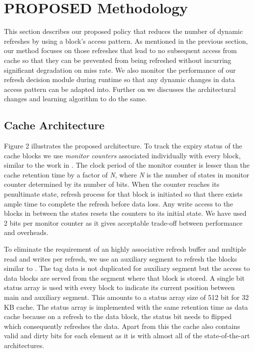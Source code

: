 \documentclass[sigconf]{acmart}
\begin{document}
\section{PROPOSED Methodology}
This section describes our proposed policy that reduces the number of dynamic refreshes by using a block's access pattern. As mentioned in the previous section, our method focuses on those refreshes that lead to no subsequent access from cache so that they can be prevented from being refreshed without incurring significant degradation on miss rate. We also monitor the performance of our refresh decision module during runtime so that any dynamic changes in data access pattern can be adapted into. Further on we discusses the architectural changes and learning algorithm to do the same.

\subsection{Cache Architecture}
Figure 2 illustrates the proposed architecture. To track the expiry status of the cache blocks we use \textit{monitor counters} associated individually with every block, similar to the work in \cite{sun}. The clock period of the monitor counter is lesser than the cache retention time by a factor of \textit{N}, where \textit{N} is the number of states in monitor counter determined by its number of bits. When the counter reaches its penultimate state, refresh process for that block is initiated so that there exists ample time to complete the refresh before data loss. Any write access to the blocks in between the states resets the counters to its initial state. We have used 2 bits per monitor counter as it gives acceptable trade-off between performance and overheads.

To eliminate the requirement of an highly associative refresh buffer and multiple read and writes per refresh, we use an auxiliary segment to refresh the blocks similar to \cite{mirror_cache}. The tag data is not duplicated for auxiliary segment but the access to data blocks are served from the segment where that block is stored. A single bit status array is used with every block to indicate its current position between main and auxiliary segment. This amounts to a status array size of 512 bit for 32 KB cache. The status array is implemented with the same retention time as data cache because on a refresh to the data block, the status bit needs to flipped which consequently refreshes the data. Apart from this the cache also contains valid and dirty bits for each element as it is with almost all of the state-of-the-art architectures.
\end{document}
